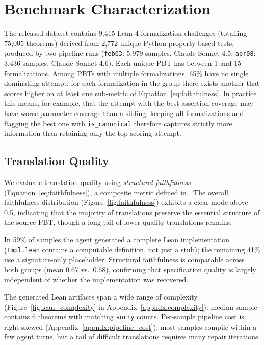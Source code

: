 \section{Benchmark Characterization}

The released dataset contains 9,415 Lean 4 formalization challenges (totalling 75,005 theorems) derived from 2,772 unique Python property-based tests, produced by two pipeline runs (\texttt{feb03}: 5,979 samples, Claude Sonnet 4.5; \texttt{apr08}: 3,436 samples, Claude Sonnet 4.6). Each unique PBT has between 1 and 15 formalizations. Among PBTs with multiple formalizations, 65\% have no single dominating attempt: for each formalization in the group there exists another that scores higher on at least one sub-metric of Equation~\ref{eq:faithfulness}. In practice this means, for example, that the attempt with the best assertion coverage may have worse parameter coverage than a sibling; keeping all formalizations and flagging the best one with \texttt{is\_canonical} therefore captures strictly more information than retaining only the top-scoring attempt.

\subsection{Translation Quality}

We evaluate translation quality using \emph{structural faithfulness} (Equation~\ref{eq:faithfulness}), a composite metric defined in . The overall faithfulness distribution (Figure~\ref{fig:faithfulness}) exhibits a clear mode above 0.5, indicating that the majority of translations preserve the essential structure of the source PBT, though a long tail of lower-quality translations remains.

In 59\% of samples the agent generated a complete Lean implementation (\texttt{Impl.lean} contains a computable definition, not just a stub); the remaining 41\% use a signature-only placeholder. Structural faithfulness is comparable across both groups (mean 0.67 vs.\ 0.68), confirming that specification quality is largely independent of whether the implementation was recovered.

The generated Lean artifacts span a wide range of complexity (Figure~\ref{fig:lean_complexity} in Appendix~\ref{appndx:complexity}): median sample contains 6 theorems with matching \texttt{sorry} counts. Per-sample pipeline cost is right-skewed (Appendix~\ref{appndx:pipeline_cost}): most samples compile within a few agent turns, but a tail of difficult translations requires many repair iterations.

